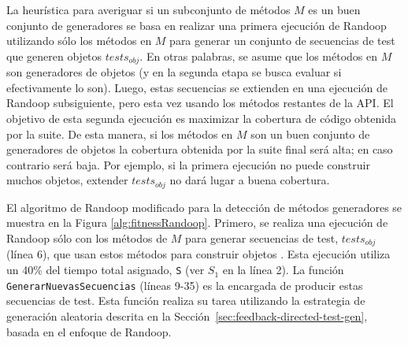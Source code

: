 La heurística para averiguar si un
subconjunto de métodos $M$ es un buen conjunto de generadores se basa en
realizar una primera ejecución de Randoop utilizando sólo los métodos en $M$ para
generar un conjunto de secuencias de test que generen objetos $tests_{obj}$. En
otras palabras, se asume que los métodos en $M$ son generadores de objetos (y
en la segunda etapa se busca evaluar si efectivamente lo son).
Luego, estas secuencias se extienden en una ejecución de Randoop subsiguiente,
pero esta vez usando los métodos restantes de la API. El objetivo de esta
segunda ejecución es maximizar la cobertura de código obtenida por la suite. 
De esta manera, si los métodos en $M$ son un buen conjunto de generadores de objetos
la cobertura obtenida por la suite final será alta; en caso contrario será baja. 
Por ejemplo, si la primera ejecución no puede construir muchos objetos, extender 
$tests_{obj}$ no dará lugar a buena cobertura.

El algoritmo de Randoop modificado para la detección de métodos generadores se muestra 
en la Figura \ref{alg:fitnessRandoop}.
Primero, se realiza una ejecución de Randoop sólo con los métodos de $M$ para
generar secuencias de test, $tests_{obj}$ (línea 6), que usan estos métodos para construir objetos . Esta ejecución utiliza un 40\% del tiempo total
asignado, \texttt{S} (ver $S_1$ en la línea 2). 
La función \texttt{GenerarNuevasSecuencias} (líneas 9-35) es la encargada de
producir estas secuencias de test. Esta función realiza su tarea utilizando 
la estrategia de generación aleatoria descrita en la Sección~\ref{sec:feedback-directed-test-gen}, basada en el enfoque de Randoop. 

